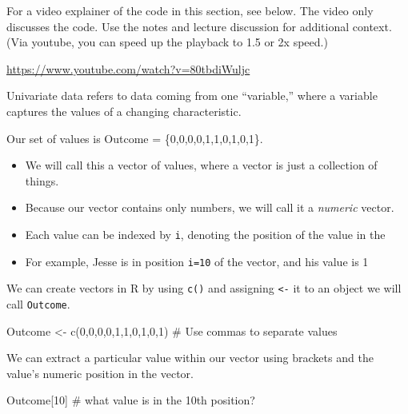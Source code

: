 \documentclass[
  letterpaper,
  DIV=11,
  numbers=noendperiod]{scrreprt}
\newenvironment{Shaded}{\begin{snugshade}}{\end{snugshade}}
\newcommand{\CommentTok}[1]{\textcolor[rgb]{0.37,0.37,0.37}{#1}}
\newcommand{\DecValTok}[1]{\textcolor[rgb]{0.68,0.00,0.00}{#1}}
\newcommand{\FunctionTok}[1]{\textcolor[rgb]{0.28,0.35,0.67}{#1}}
\newcommand{\NormalTok}[1]{\textcolor[rgb]{0.00,0.23,0.31}{#1}}
\newcommand{\OtherTok}[1]{\textcolor[rgb]{0.00,0.23,0.31}{#1}}
\providecommand{\tightlist}{%
  \setlength{\itemsep}{0pt}\setlength{\parskip}{0pt}}\usepackage{longtable,booktabs,array}
\begin{document}
For a video explainer of the code in this section, see below. The video
only discusses the code. Use the notes and lecture discussion for
additional context. (Via youtube, you can speed up the playback to 1.5
or 2x speed.)

\url{https://www.youtube.com/watch?v=80tbdiWuljc}

Univariate data refers to data coming from one ``variable,'' where a
variable captures the values of a changing characteristic.

Our set of values is Outcome = \{0,0,0,0,1,1,0,1,0,1\}.

\begin{itemize}
\tightlist
\item
  We will call this a vector of values, where a vector is just a
  collection of things.
\item
  Because our vector contains only numbers, we will call it a
  \emph{numeric} vector.
\item
  Each value can be indexed by \texttt{i}, denoting the position of the
  value in the
\item
  For example, Jesse is in position \texttt{i=10} of the vector, and his
  value is 1
\end{itemize}

We can create vectors in R by using \texttt{c()} and assigning
\texttt{\textless{}-} it to an object we will call \texttt{Outcome}.

\begin{Shaded}
\begin{Highlighting}[]
\NormalTok{Outcome }\OtherTok{\textless{}{-}} \FunctionTok{c}\NormalTok{(}\DecValTok{0}\NormalTok{,}\DecValTok{0}\NormalTok{,}\DecValTok{0}\NormalTok{,}\DecValTok{0}\NormalTok{,}\DecValTok{1}\NormalTok{,}\DecValTok{1}\NormalTok{,}\DecValTok{0}\NormalTok{,}\DecValTok{1}\NormalTok{,}\DecValTok{0}\NormalTok{,}\DecValTok{1}\NormalTok{) }\CommentTok{\# Use commas to separate values}
\end{Highlighting}
\end{Shaded}

We can extract a particular value within our vector using brackets and
the value's numeric position in the vector.

\begin{Shaded}
\begin{Highlighting}[]
\NormalTok{Outcome[}\DecValTok{10}\NormalTok{] }\CommentTok{\# what value is in the 10th position?}
\end{Highlighting}
\end{Shaded}
\end{document}
